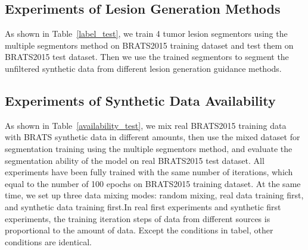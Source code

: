 \documentclass[letterpaper]{article} %
\begin{document}
\subsection{Experiments of Lesion Generation Methods}
\label{label gen methods tests}
As shown in Table~\ref{label_test}, we train 4 tumor lesion segmentors using the multiple segmentors method on BRATS2015 training dataset and test them on BRATS2015 test dataset. Then we use the trained segmentors to segment the unfiltered synthetic data from different lesion generation guidance methods.

\subsection{Experiments of Synthetic Data Availability}
As shown in Table~\ref{availability_test}, we mix real BRATS2015 training data with BRATS synthetic data in different amounts, then use the mixed dataset for segmentation training using the multiple segmentors method, and evaluate the segmentation ability of the model on real BRATS2015 test dataset. All experiments have been fully trained with the same number of iterations, which equal to the number of 100 epochs on BRATS2015 training dataset. At the same time, we set up three data mixing modes: random mixing, real data training first, and synthetic data training first.In real first experiments and synthetic first experiments, the training iteration steps of data from different sources is proportional to the amount of data. Except the conditions in tabel, other conditions are identical.
\end{document}
